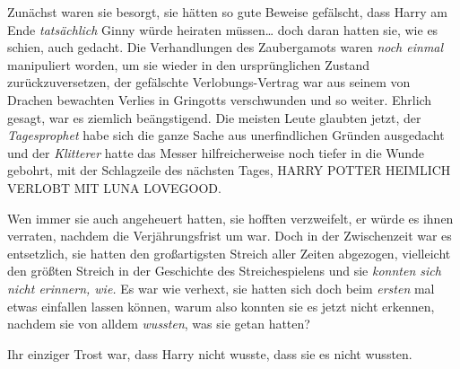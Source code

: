 Zunächst waren sie besorgt, sie hätten so gute Beweise gefälscht, dass Harry am Ende \emph{tatsächlich} Ginny würde heiraten müssen… doch daran hatten sie, wie es schien, auch gedacht. Die Verhandlungen des Zaubergamots waren \emph{noch einmal} manipuliert worden, um sie wieder in den ursprünglichen Zustand zurückzuversetzen, der gefälschte Verlobungs-Vertrag war aus seinem von Drachen bewachten Verlies in Gringotts verschwunden und so weiter. Ehrlich gesagt, war es ziemlich beängstigend. Die meisten Leute glaubten jetzt, der \emph{Tagesprophet} habe sich die ganze Sache aus unerfindlichen Gründen ausgedacht und der \emph{Klitterer} hatte das Messer hilfreicherweise noch tiefer in die Wunde gebohrt, mit der Schlagzeile des nächsten Tages, HARRY POTTER HEIMLICH VERLOBT MIT LUNA LOVEGOOD.

Wen immer sie auch angeheuert hatten, sie hofften verzweifelt, er würde es ihnen verraten, nachdem die Verjährungsfrist um war. Doch in der Zwischenzeit war es entsetzlich, sie hatten den großartigsten Streich aller Zeiten abgezogen, vielleicht den größten Streich in der Geschichte des Streichespielens und sie \emph{konnten sich nicht erinnern, wie.} Es war wie verhext, sie hatten sich doch beim \emph{ersten} mal etwas einfallen lassen können, warum also konnten sie es jetzt nicht erkennen, nachdem sie von alldem \emph{wussten}, was sie getan hatten?

Ihr einziger Trost war, dass Harry nicht wusste, dass sie es nicht wussten.

